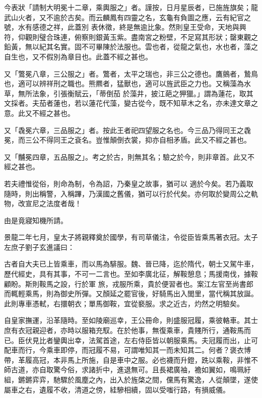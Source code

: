 \begin{pinyinscope}
 今表狀「請制大明冕十二章，乘輿服之」者。謹按，日月星辰者，已施旌旗矣；龍武山火者，又不逾於古矣。而云麟鳳有四靈之名，玄龜有負圖之應，云有紀官之號，水有感德之祥，此蓋別
 表休徵，終是無逾比象。然則皇王受命，天地與興符，仰觀則璧合珠連，俯察則銀黃玉紫。盡南宮之粉壁，不足寫其形狀；罄東觀之鉛黃，無以紀其名實。固不可畢陳於法服也。雲也者，從龍之氣也，水也者，藻之自生也，又不假別為章目也。此蓋不經之甚也。



 又「鷩冕八章，三公服之」者。鷩者，太平之瑞也，非三公之德也。鷹鸇者，鷙鳥也，適可以辨祥刑之職也。熊羆者，猛獸也，適可以旌武臣之力也。又稱藻為水草，無所法象，引張衡賦云，「蒂倒茄
 於藻井，披江葩之狎獵。」謂為蓮花，取其文採者。夫茄者蓮也，若以蓮花代藻，變古從今，既不知草木之名，亦未達文章之意。此又不經之甚也。



 又「毳冕六章，三品服之」者。按此王者祀四望服之名也。今三品乃得同王之毳冕，而三公不得同王之袞名。豈惟顛倒衣裳，抑亦自相矛盾。此又不經之甚也。



 又「黼冕四章，五品服之」。考之於古，則無其名；驗之於今，則非章首。此又不經之甚也。



 若夫禮惟從俗，則命為制，令為詔，乃秦皇之故事，猶可以
 適於今矣。若乃義取隨時，則出稱警，入稱蹕，乃漢國之舊儀，猶可以行於代矣。亦何取於變周公之軌物，改宣尼之法度者哉！



 由是竟寢知機所請。



 景龍二年七月，皇太子將親釋奠於國學，有司草儀注，令從臣皆乘馬著衣冠。太子左庶子劉子玄進議曰：



 古者自大夫已上皆乘車，而以馬為騑服。魏、晉已降，迄於隋代，朝士又駕牛車，歷代經史，具有其事，不可一二言也。至如李廣北征，解鞍憩息；馬援南伐，據鞍顧盼。斯則鞍馬之設，行於軍
 旅，戎服所乘，貴於便習者也。案江左官至尚書郎而輒輕乘馬，則為御史所彈。又顏延之罷官後，好騎馬出入閭里，當代稱其放誕。此則專車憑軾，右擐朝衣；單馬御鞍，宜從褻服。求之近古，灼然之明驗矣。



 自皇家撫運，沿革隨時。至如陵廟巡幸，王公冊命，則盛服冠履，乘彼輅車。其士庶有衣冠親迎者，亦時以服箱充馭。在於他事，無復乘車，貴賤所行，通鞍馬而已。臣伏見比者鑾輿出幸，法駕首途，左右侍臣皆以朝服乘馬。夫冠履而出，止可
 配車而行，今乘車即停，而冠履不易，可謂唯知其一而未知其二。何者？褒衣博帶，革履高冠，本非馬上所施，自是車中之服。必也襪而升鐙，跣以乘鞍，非惟不師古道，亦自取驚今俗，求諸折中，進退無可。且長裙廣袖，襜如翼如，鳴珮紆組，鏘鏘弈弈，馳驟於風塵之內，出入於旌棨之間，儻馬有驚逸，人從顛墜，遂使屬車之右，遺履不收，清道之傍，絓驂相續，固以受嗤行路，有損威儀。




\end{pinyinscope}
